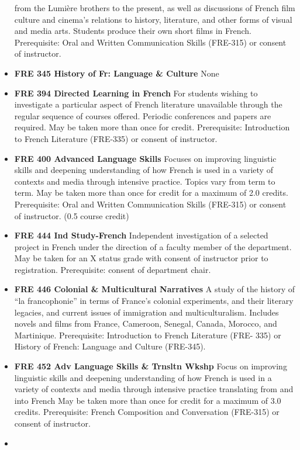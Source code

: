 \documentclass[
  letterpaper,
]{scrbook}
\begin{document}
\begin{itemize}
  from the Lumière brothers to the present, as well as discussions of
  French film culture and cinema's relations to history, literature, and
  other forms of visual and media arts. Students produce their own short
  films in French. Prerequisite: Oral and Written Communication Skills
  (FRE-315) or consent of instructor.
\item
  \textbf{FRE 345 History of Fr: Language \& Culture} None
\item
  \textbf{FRE 394 Directed Learning in French} For students wishing to
  investigate a particular aspect of French literature unavailable
  through the regular sequence of courses offered. Periodic conferences
  and papers are required. May be taken more than once for credit.
  Prerequisite: Introduction to French Literature (FRE-335) or consent
  of instructor.
\item
  \textbf{FRE 400 Advanced Language Skills} Focuses on improving
  linguistic skills and deepening understanding of how French is used in
  a variety of contexts and media through intensive practice. Topics
  vary from term to term. May be taken more than once for credit for a
  maximum of 2.0 credits. Prerequisite: Oral and Written Communication
  Skills (FRE-315) or consent of instructor. (0.5 course credit)
\item
  \textbf{FRE 444 Ind Study-French} Independent investigation of a
  selected project in French under the direction of a faculty member of
  the department. May be taken for an X status grade with consent of
  instructor prior to registration. Prerequisite: consent of department
  chair.
\item
  \textbf{FRE 446 Colonial \& Multicultural Narratives} A study of the
  history of ``la francophonie'' in terms of France's colonial
  experiments, and their literary legacies, and current issues of
  immigration and multiculturalism. Includes novels and films from
  France, Cameroon, Senegal, Canada, Morocco, and Martinique.
  Prerequisite: Introduction to French Literature (FRE- 335) or History
  of French: Language and Culture (FRE-345).
\item
  \textbf{FRE 452 Adv Language Skills \& Trnsltn Wkshp} Focus on
  improving linguistic skills and deepening understanding of how French
  is used in a variety of contexts and media through intensive practice
  translating from and into French May be taken more than once for
  credit for a maximum of 3.0 credits. Prerequisite: French Composition
  and Conversation (FRE-315) or consent of instructor.
\item

\end{itemize}
\end{document}
